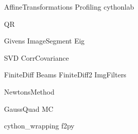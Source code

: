 \documentclass[nociteref]{SIAM-GH-book}
\begin{document}
{AffineTransformations}
{Profiling}
{cythonlab}

{QR}


{Givens}
{ImageSegment}
{Eig}


{SVD}
{CorrCovariance}

{FiniteDiff}
{Beams}
{FiniteDiff2}
{ImgFilters}

{NewtonsMethod}


{GaussQuad}
{MC}

{cython_wrapping}
{f2py}
\end{document}
